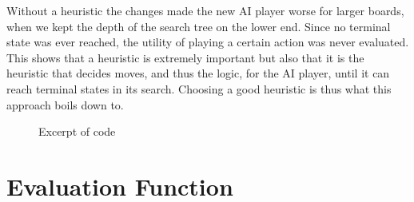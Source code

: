 \documentclass[11pt, a4paper]{article}
\begin{document}
Without a heuristic the changes made the new AI player worse for larger boards,
when we kept the depth of the search tree on the lower end. Since no terminal
state was ever reached, the utility of playing a certain action was never
evaluated. This shows that a heuristic is extremely important but also that it
is the heuristic that decides moves, and thus the logic, for the AI player,
until it can reach terminal states in its search. Choosing a good heuristic is
thus what this approach boils down to.


\begin{figure}

\caption{ Excerpt of code}\label{label1}
\end{figure}


\section*{Evaluation Function}
\end{document}
